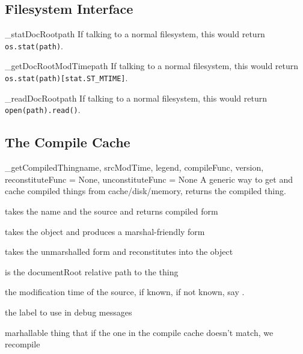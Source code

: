 \subsection{Filesystem Interface}
\begin{funcdesc}{\_statDocRoot}{path}
If talking to a normal filesystem, this would return \verb!os.stat(path)!.
\end{funcdesc}
\begin{funcdesc}{\_getDocRootModTime}{path}
If talking to a normal filesystem, this would return 
\verb!os.stat(path)[stat.ST_MTIME]!. 
\end{funcdesc}
\begin{funcdesc}{\_readDocRoot}{path}
If talking to a normal filesystem, this would return 
\verb!open(path).read()!.
\end{funcdesc}

\subsection{The Compile Cache}
\begin{funcdesc}{\_getCompiledThing}{name, srcModTime, legend,
compileFunc, version, reconstituteFunc = None, unconstituteFunc =
None} 
A generic way to get and cache compiled things from cache/disk/memory,
returns the compiled thing.
\begin{argdesc}
\item[compileFunc]      takes the name and the source and returns compiled form
\item[unconstituteFunc] takes the object and produces a marshal-friendly form
\item[reconstituteFunc] takes the unmarshalled form and reconstitutes into
                 the object
\item[name]             is the documentRoot relative path to the thing
\item[srcModTime]       the modification time of the source, if known,
if not known, say \None.
\item[legend]           the label to use in debug messages
\item[version]          marhallable thing that if the one in the compile cache
                 doesn't match, we recompile
\end{argdesc}
\end{funcdesc}


